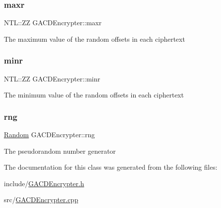 \subsubsection{\texorpdfstring{maxr}{maxr}}
{\footnotesize\ttfamily N\+T\+L\+::\+ZZ G\+A\+C\+D\+Encrypter\+::maxr\hspace{0.3cm}{\ttfamily [private]}}

The maximum value of the random offsets in each ciphertext \mbox{\label{classGACDEncrypter_a6b0e9a07d27ec0976cc7958df6f666a4}} 
\subsubsection{\texorpdfstring{minr}{minr}}
{\footnotesize\ttfamily N\+T\+L\+::\+ZZ G\+A\+C\+D\+Encrypter\+::minr\hspace{0.3cm}{\ttfamily [private]}}

The minimum value of the random offsets in each ciphertext \mbox{\label{classGACDEncrypter_a3f8959f045b15262ae7d680b35d0815c}} 
\subsubsection{\texorpdfstring{rng}{rng}}
{\footnotesize\ttfamily \hyperlink{classRandom}{Random} G\+A\+C\+D\+Encrypter\+::rng\hspace{0.3cm}{\ttfamily [private]}}

The pseudorandom number generator 

The documentation for this class was generated from the following files\+:\begin{DoxyCompactItemize}
\item 
include/\hyperlink{GACDEncrypter_8h}{G\+A\+C\+D\+Encrypter.\+h}\item 
src/\hyperlink{GACDEncrypter_8cpp}{G\+A\+C\+D\+Encrypter.\+cpp}\end{DoxyCompactItemize}
